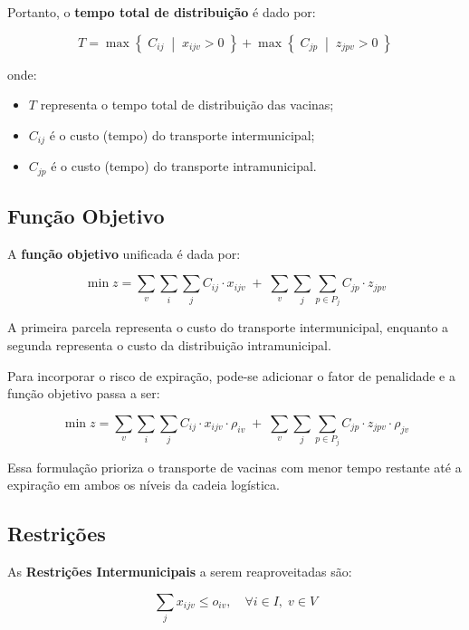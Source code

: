 Portanto, o \textbf{tempo total de distribuição} é dado por:

\[
T = \max \left\{ \; C_{ij} \;\middle|\; x_{ijv} > 0 \; \right\} + 
\max \left\{ \; C_{jp} \;\middle|\; z_{jpv} > 0 \; \right\}
\]

onde:
\begin{itemize}
    \item $T$ representa o tempo total de distribuição das vacinas;
    \item $C_{ij}$ é o custo (tempo) do transporte intermunicipal;
    \item $C_{jp}$ é o custo (tempo) do transporte intramunicipal.
\end{itemize}

\subsection{Função Objetivo}

A \textbf{função objetivo} unificada é dada por:

\begin{equation}
\min z = 
\sum_{v} \sum_{i} \sum_{j} C_{ij} \cdot x_{ijv}
\;+\;
\sum_{v} \sum_{j} \sum_{p \in P_j} C_{jp} \cdot z_{jpv}
\label{unificado_sem_penalidade}
\end{equation}

A primeira parcela representa o custo do transporte intermunicipal, enquanto a segunda representa o custo da distribuição intramunicipal.

Para incorporar o risco de expiração, pode-se adicionar o fator de penalidade e a função objetivo passa a ser:

\begin{equation}
\min z = 
\sum_{v} \sum_{i} \sum_{j} C_{ij} \cdot x_{ijv} \cdot \rho_{iv}
\;+\;
\sum_{v} \sum_{j} \sum_{p \in P_j} C_{jp} \cdot z_{jpv} \cdot \rho_{jv}
\label{unificado_com_penalidade}
\end{equation}

Essa formulação prioriza o transporte de vacinas com menor tempo restante até a expiração em ambos os níveis da cadeia logística.

\subsection{Restrições}

As \textbf{Restrições Intermunicipais} a serem reaproveitadas são:

\begin{equation*}
\sum_{j} x_{ijv} \le o_{iv}, \quad \forall i \in I, \; v \in V
\end{equation*}

